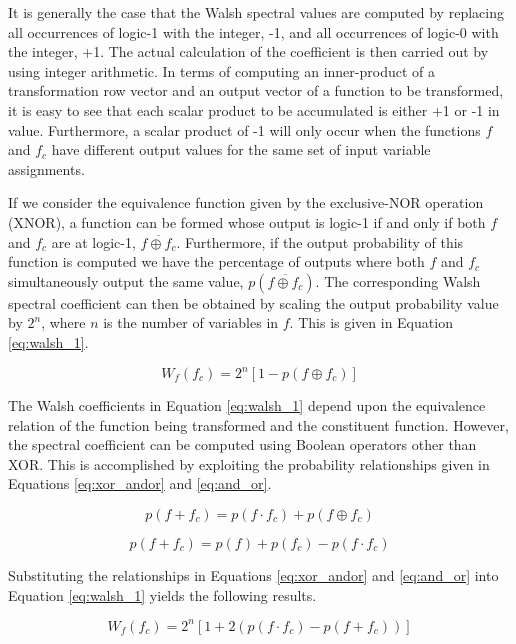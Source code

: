 It is generally the case that the Walsh spectral values are computed by replacing
all occurrences of logic-1 with the integer, -1, and all occurrences of logic-0
with the integer, +1.  The actual calculation of the coefficient is then
carried out by using integer arithmetic.  In terms of computing an inner-product
of a transformation row vector and an output vector of a function to be transformed,
it is easy to see that each scalar product to be accumulated is either +1 or -1 in value.
Furthermore, a scalar product of -1 will only occur when the functions $f$ and $f_c$ have
different output values for the same set of input variable assignments.

If we consider the equivalence function given by the exclusive-NOR operation (XNOR),
a function can be formed whose output is logic-1 if and only if both $f$ and $f_c$ are at
logic-1, $\overline{f \oplus f_c}$.  Furthermore, if the output probability of this function
is computed we have the percentage of outputs where both $f$ and $f_c$ simultaneously
output the same value, $p(\overline{f \oplus f_c})$.  The corresponding Walsh
spectral coefficient can then be obtained by scaling the output probability value by
$2^n$, where $n$ is the number of variables in $f$.  This is given in Equation
\ref{eq:walsh_1}.

\begin{equation}
W_f(f_c) = 2^n [ 1-p(f \oplus f_c)]    \label{eq:walsh_1}
\end{equation}

The Walsh coefficients in Equation \ref{eq:walsh_1} depend upon the equivalence relation of
the function being transformed and the constituent function.  However, the spectral 
coefficient can be computed using Boolean operators other than XOR.  This is accomplished by
exploiting the probability relationships given in Equations \ref{eq:xor_andor}
and \ref{eq:and_or}.

\begin{equation}
p(f+f_c)=p(f \cdot f_c)+p(f \oplus f_c)   \label{eq:xor_andor}
\end{equation}

\begin{equation}
p(f+f_c)=p(f)+p(f_c)-p(f \cdot f_c)   \label{eq:and_or}
\end{equation}

Substituting the relationships in Equations \ref{eq:xor_andor} and 
\ref{eq:and_or} into Equation 
\ref{eq:walsh_1} yields the following results.

\begin{equation}
W_f(f_c) = 2^n [1+2 (p(f \cdot f_c)-p(f+f_c))]  \label{eq:walsh_2}
\end{equation}

